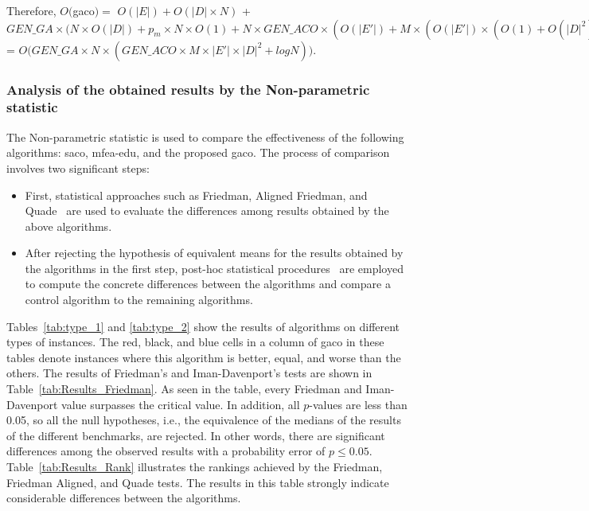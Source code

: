 Therefore, $O($\acrshort{gaco}$) = $
$O(|E|) + O(|D|\times N)$ + $GEN\_GA\times\bigg(N \times O(|D|) + p_{m}\times N\times O(1) + N\times GEN\_ACO\times (O(|E'|) + M\times (O(|E'|)\times (O(1)+O(|D|^2)))) + N\times O(logN))\bigg)$
= $O\bigg(GEN\_GA\times N\times (GEN\_ACO\times M\times|E'|\times|D|^2 +logN)\bigg)$.

\subsubsection{Analysis of the obtained results by the Non-parametric statistic}
The Non-parametric statistic is used to compare the effectiveness of the following algorithms: \acrshort{saco}, \acrshort{mfea-edu}, and the proposed \acrshort{gaco}. The process of comparison involves two significant steps:
\begin{itemize}
	\item First, statistical approaches such as Friedman, Aligned Friedman, and Quade~\cite{carrasco_recent_2020, derrac_practical_2011} are used to evaluate the differences among results obtained by the above algorithms.
	\item After rejecting the hypothesis of equivalent means for the results obtained by the algorithms in the first step, post-hoc statistical procedures~\cite{carrasco_recent_2020} are employed to compute the concrete differences between the algorithms and compare a control algorithm to the remaining algorithms.
\end{itemize}

Tables~\ref{tab:type_1} and \ref{tab:type_2} show the results of algorithms on different types of instances. The red, black, and blue cells in a column of \acrshort{gaco} in these tables denote instances where this algorithm is better, equal, and worse than the others.
The results of Friedman's and Iman-Davenport's tests are shown in Table~\ref{tab:Results_Friedman}. As seen in the table, every Friedman and Iman-Davenport value surpasses the critical value. In addition, all $p$-values are less than 0.05, so all the null hypotheses, i.e., the equivalence of the medians of the results of the different benchmarks, are rejected. In other words, there are significant differences among the observed results with a probability error of $p \leq 0.05$. Table~\ref{tab:Results_Rank} illustrates the rankings achieved by the Friedman, Friedman Aligned, and Quade tests. The results in this table strongly indicate considerable differences between the algorithms.


